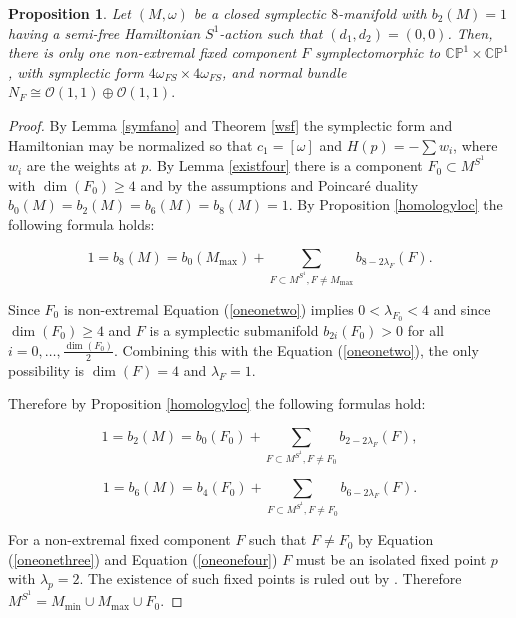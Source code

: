 \documentclass[12pt]{article}
\newtheorem{proposition}[theorem]{Proposition}
\begin{document}
\begin{proposition} \label{oneonecase} Let $(M,\omega)$ be a closed symplectic $8$-manifold with $b_{2}(M)=1$ having a semi-free Hamiltonian $S^1$-action such that $(d_1,d_2) = (0,0)$. Then, there is only one non-extremal fixed component $F$ symplectomorphic to $ \mathbb{CP}^1 \times \mathbb{CP}^1$, with symplectic form $4\omega_{FS} \times4\omega_{FS}$, and normal bundle $N_{F} \cong \mathcal{O}(1,1) \oplus \mathcal{O}(1,1).$
\end{proposition}
\begin{proof}
By Lemma \ref{symfano} and Theorem \ref{wsf} the symplectic form and Hamiltonian may be normalized so that $c_1 = [\omega]$ and $H(p) = -\sum w_i$, where $w_i$ are the weights at $p$. By Lemma \ref{existfour} there is a component $F_0 \subset M^{S^1}$ with $\dim(F_0) \geq 4 $ and by the assumptions and Poincar\'{e} duality $b_{0}(M)= b_{2}(M)= b_{6}(M)= b_{8}(M)=1$. By Proposition \ref{homologyloc} the following formula holds: 


\begin{equation} \label{oneonetwo}  
1= b_{8}(M) = b_{0}(M_{\max}) +  \sum_{F \subset M^{S^1}, F \neq M_{\max}} b_{8-2\lambda_{F}}(F).  \end{equation}

Since $F_0$ is non-extremal Equation (\ref{oneonetwo}) implies $0<\lambda_{F_0} <4$ and since $\dim(F_0) \geq 4$ and $F$ is a symplectic submanifold $b_{2i}(F_0)>0$ for all $i=0, \ldots, \frac{\dim(F_0)}{2}$. Combining this with the Equation  (\ref{oneonetwo}), the only possibility is $\dim(F)=4$ and $\lambda_{F}=1$.

Therefore by Proposition \ref{homologyloc} the following formulas hold: 

\begin{equation} \label{oneonethree}  
1= b_{2}(M) =  b_{0}(F_0) + \sum_{F \subset M^{S^1}, F \neq F_0} b_{2-2\lambda_{F}}(F), \end{equation}


\begin{equation} \label{oneonefour}  
1= b_{6}(M) =  b_{4}(F_0)  + \sum_{F \subset M^{S^1} , F \neq F_0} b_{6-2\lambda_{F}}(F).  \end{equation}

For a non-extremal fixed component $F$ such that $F \neq F_{0}$ by Equation (\ref{oneonethree}) and Equation (\ref{oneonefour}) $F$ must be an isolated fixed point $p$ with $\lambda_{p}=2$. The existence of such fixed points is ruled out by \cite[Lemma 3.1]{T}. Therefore $M^{S^1} = M_{\min}\cup M_{\max} \cup  F_0$.


\end{proof}
\end{document}
